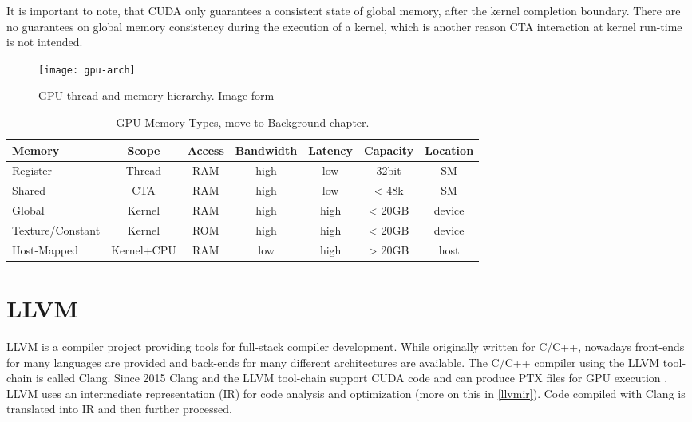 It is important to note, that CUDA only guarantees a consistent state of global memory, after the kernel completion 
boundary. There are no guarantees on global memory consistency during the execution of a kernel, which is another reason
CTA interaction at kernel run-time is not intended. \cite[B5-B7]{cuda-man}
\begin{figure}[t]
	\centering
	\texttt{[image: gpu-arch]}
	\caption{GPU thread and memory hierarchy. Image form \cite{}}
	\label{gpu-hier}
\end{figure}
\begin{table}
	\centering
	\begin{tabular}{|l|c|c|c|c|c|c|}
		\hline 
		\textbf{Memory} & \textbf{Scope} & \textbf{Access} & \textbf{Bandwidth} & \textbf{Latency} & \textbf{Capacity} & \textbf{Location} \\ 
		\hline
		\hline
		Register  & Thread & RAM & high & low & 32bit & SM \\ 
		Shared  & CTA & RAM & high & low & < 48k & SM \\ 
		Global  & Kernel & RAM & high & high & < 20GB & device \\ 
		Texture/Constant & Kernel & ROM & high & high & < 20GB & device \\ 
		Host-Mapped  & Kernel+CPU & RAM & low & high & > 20GB & host \\ 
		\hline 
	\end{tabular} 
	\caption{GPU Memory Types, move to Background chapter. \cite[2.3]{cuda-man}}
	\label{GPUMemTable}
\end{table}
\section{LLVM}
LLVM is a compiler project providing tools for full-stack compiler development. While originally written for C/C++, nowadays front-ends for many languages are provided and back-ends for many different architectures are available. The C/C++ compiler using the LLVM tool-chain is called Clang. Since 2015 Clang and the LLVM
tool-chain support CUDA code and can produce PTX files for GPU execution \cite{gpucc}.
LLVM uses an intermediate representation (IR) for code analysis and optimization 
(more on this in \ref{llvmir}). Code compiled with Clang is translated into IR and then further processed. \cite{Lattner:2004:LCF:977395.977673}

